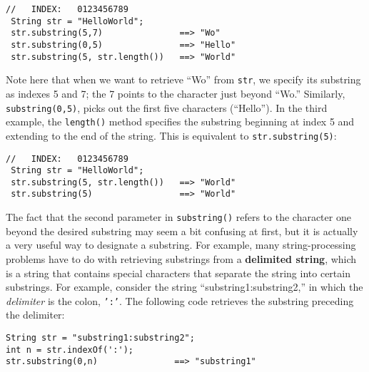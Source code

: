 \begin{jjjlisting}
\begin{lstlisting}[commentstyle=\small]
 //   INDEX:   0123456789
 String str = "HelloWorld";
 str.substring(5,7)               ==> "Wo"
 str.substring(0,5)               ==> "Hello"
 str.substring(5, str.length())   ==> "World"
\end{lstlisting}
\end{jjjlisting}


\noindent Note here that when we want to retrieve ``Wo''
from {\tt str}, we specify its substring as indexes 5 and 7; the 7
points to the character just beyond ``Wo.'' Similarly,
{\tt substring(0,5)}, picks out the first five characters (``Hello'').  
In the third example, the {\tt length()} method specifies
the substring beginning at index 5 and extending to the end of the
string.  This is equivalent to {\tt str.substring(5)}:

\begin{jjjlisting}
\begin{lstlisting}[commentstyle=\small]
 //   INDEX:   0123456789
 String str = "HelloWorld";
 str.substring(5, str.length())   ==> "World"
 str.substring(5)                 ==> "World"
\end{lstlisting}
\end{jjjlisting}


\noindent The fact that the second parameter in {\tt substring()}
refers to the character one beyond the desired substring may seem a
bit confusing at first, but it is actually a very useful way to
designate a substring.  For example, many string-processing problems
have to do with retrieving substrings from a {\bf delimited string},
which is a string that contains special characters that separate
the string into certain substrings.
For example, consider the string ``substring1:substring2,''
in which the {\it delimiter} is the colon, {\tt ':'}. The following code
retrieves the substring preceding the delimiter:

\begin{jjjlisting}
\begin{lstlisting}
String str = "substring1:substring2";
int n = str.indexOf(':');
str.substring(0,n)               ==> "substring1"
\end{lstlisting}
\end{jjjlisting}

